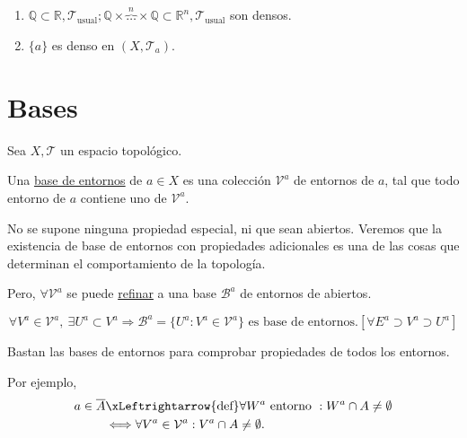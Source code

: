 \begin{ej}
\begin{enumerate}
    \item $\mathbb{Q} \subset \mathbb{R}, \mathcal{T}_{\text{usual}}; \mathbb{Q} \times \overbrace{\ldots}^{n} \times \mathbb{Q} \subset \mathbb{R}^n, \mathcal{T}_{\text{usual}}$ son densos.
    \item $\{a\}$ es denso en $\left( X, \mathcal{T}_a \right)$.
\end{enumerate}
\end{ej}

\section{Bases}%
\label{sec:bases}
Sea $X, \mathcal{T}$ un espacio topológico.
\begin{defi}
Una \underline{base de entornos} de $a \in X$ es una colección $\mathcal{V}^a$ de entornos de $a$, tal que todo entorno de $a$ contiene uno de $\mathcal{V}^a$.
\end{defi}

\begin{obs}
No se supone ninguna propiedad especial, ni que sean abiertos. Veremos que la existencia de base de entornos con propiedades adicionales es una de las cosas que determinan el comportamiento de la topología.

Pero, $\forall \mathcal{V}^a$ se puede \underline{refinar} a una base $\mathcal{B}^a$ de entornos de abiertos. 
\begin{demo}    
\[
\forall V^a \in \mathcal{V}^a,\ \exists U^a \subset V^a \Rightarrow \mathcal{B}^a = \{U^a: V^a \in \mathcal{V}^a\} \text{ es base de entornos}. \left[ \forall E^a \supset V^a \supset U^a \right] 
\]
\end{demo}
\end{obs}

\begin{pg}
    Bastan las bases de entornos para comprobar propiedades de todos los entornos.
\end{pg}

\begin{il}    
Por ejemplo,
\begin{align*}
    a \in \overline{A} &\xLeftrightarrow{\text{def}} \forall W^a \text{ entorno }: W^a \cap A \neq \emptyset\\
   &\Longleftrightarrow \forall V^a \in \mathcal{V}^a: V^a\cap A \neq \emptyset 
.\end{align*}
\end{il}


